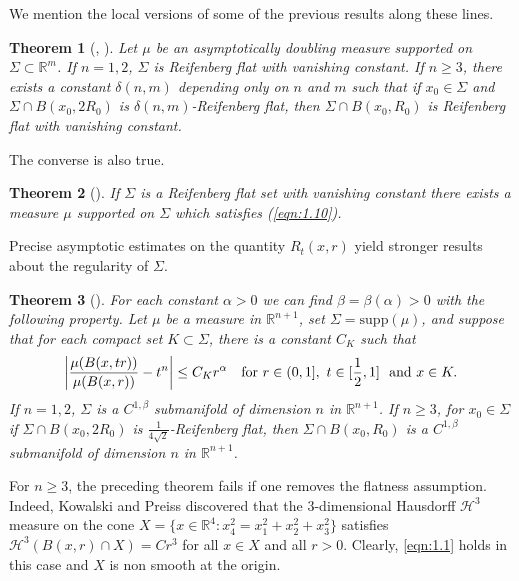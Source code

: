 \documentclass[12pt,leqno]{article}
\newcommand{\RR}{\mathbb{R}}
\newcommand{\support}{\mathrm{supp}}
\renewcommand{\H}{\mathcal{H}}
\theoremstyle{plain}
\newtheorem{thm}{Theorem}[section]
\numberwithin{equation}{section}
\begin{document}
We mention the local versions of
some of the previous results along these lines.


\begin{thm}[\cite{KT}, \cite{DKT}]\label{thm:1.16}
Let $\mu$ be an asymptotically doubling  measure supported on
$\Sigma\subset \RR^{m}$.
If $n=1,2$, $\Sigma$ is Reifenberg flat with
vanishing constant.
If $n\ge 3$, there exists a constant $\delta(n,m)$ depending
only on $n$ and $m$ such that if $x_0\in\Sigma$ and $\Sigma\cap B(x_0, 2R_0)$
is $\delta(n,m)$-Reifenberg flat, then $\Sigma\cap B(x_0, R_0)$
is Reifenberg flat with vanishing constant.
\end{thm}

The converse is also true.

\begin{thm}[\cite{DKT}]\label{thm:1.12}
If $\Sigma$ is a Reifenberg flat set with vanishing constant
there exists a
measure $\mu$ supported on $\Sigma$ which satisfies (\ref{eqn:1.10}).
\end{thm}


Precise asymptotic estimates on the quantity $R_t(x,r)$
yield stronger results about the regularity of $\Sigma$.


\begin{thm}[\cite{DKT}]\label{thm:1.17}
For each constant $\alpha>0$ we can find $\beta=\beta(\alpha)>0$ with the
following property. Let $\mu$ be a measure in $\RR^{n+1}$,
set $\Sigma=\support(\mu)$, and suppose that for each compact set
$K\subset\Sigma$, there is a constant $C_K$ such that
\begin{equation}\label{eqn:1.1}
\left|\frac{\mu(B(x,tr))}{\mu(B(x,r))} - t^n\right|\le
C_Kr^\alpha \ \ \ \hbox{for}\
r\in (0,1],\ t\in[\frac{1}{2},1]\ \hbox{ and}\  x\in K.
\end{equation}
If $n=1,2$, $\Sigma$ is
a $C^{1,\beta}$ submanifold of dimension $n$ in $\RR^{n+1}$.
If $n\ge 3$, for $x_0\in\Sigma$ if $\Sigma\cap B(x_0, 2R_0)$
is $\frac{1}{4\sqrt{2}}$-Reifenberg flat, then $\Sigma\cap B(x_0, R_0)$
is a $C^{1,\beta}$ submanifold of dimension $n$ in $\RR^{n+1}$.
\end{thm}

For $n\geq 3$, the preceding theorem fails if one removes the flatness assumption. Indeed, Kowalski and Preiss \cite{KoP}
discovered that the $3$-dimensional Hausdorff $\H^3$ measure on the cone
$X=\{x\in \RR^4:x_4^2 = x_1^2+x_2^2+ x_3^2\}$
satisfies $\H^3(B(x,r)\cap X)=Cr^3$ for all $x\in X$ and all $r>0$. Clearly,
\eqref{eqn:1.1} holds in this case and $X$ is non smooth at the origin.
\end{document}
